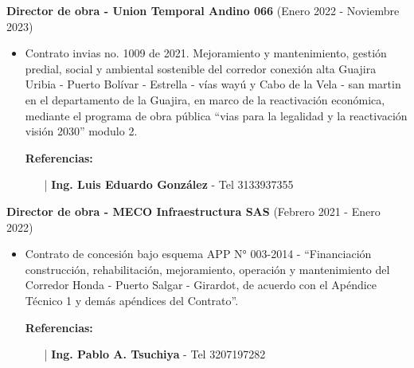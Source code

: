 \documentclass[letterpaper,10pt]{article}
\begin{document}
  \vspace*{0.1cm}
  \textbf{Director de obra - Union Temporal Andino 066} (Enero 2022 - Noviembre 2023)
  \hfill
  \vspace*{0.1cm}
  \begin{minipage}{\linewidth}
    \begin{itemize}[noitemsep]
      \item Contrato invias no. 1009 de 2021. Mejoramiento y mantenimiento, gestión predial, social y ambiental sostenible del corredor conexión alta Guajira Uribia - Puerto Bolívar - Estrella - vías wayú y Cabo de la Vela - san martin en el departamento de la Guajira, en marco de la reactivación económica, mediante el programa de obra pública “vias para la legalidad y la reactivación visión 2030” modulo 2.
      \item [] \textbf{Referencias:}
      \begin{itemize}[noitemsep]
        \vspace*{-0.2cm}
        \item [|] \textbf{Ing. Luis Eduardo González} - Tel 3133937355
      \end{itemize}
    \end{itemize}
    \hfill
  \end{minipage}

  \vspace*{0.1cm}
  \textbf{Director de obra - MECO Infraestructura SAS} (Febrero 2021 - Enero 2022)
  \hfill
  \vspace*{0.1cm}
  \begin{minipage}{\linewidth}
    \begin{itemize}[noitemsep]
      \item Contrato de concesión bajo esquema APP N° 003-2014 - “Financiación construcción, rehabilitación, mejoramiento, operación y mantenimiento del Corredor Honda - Puerto Salgar - Girardot, de acuerdo con el Apéndice Técnico 1 y demás apéndices del Contrato”.
      \item [] \textbf{Referencias:}
      \begin{itemize}[noitemsep]
        \vspace*{-0.2cm}
        \item [|] \textbf{Ing. Pablo A. Tsuchiya} - Tel 3207197282
      \end{itemize}
    \end{itemize}
    \hfill
  \end{minipage}
  
\end{document}
